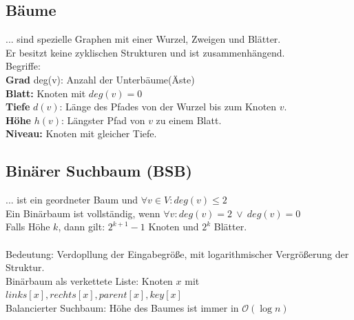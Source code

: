 \documentclass[fs, footer]{latex4ei}
\begin{document}
\begin{multicols*}{4}
{{\subsection{Bäume}
... sind spezielle Graphen mit einer Wurzel, Zweigen und Blätter.\\
Er besitzt keine zyklischen Strukturen und ist zusammenhängend.\\

Begriffe:\\
\textbf{Grad} deg(v): Anzahl der Unterbäume(Äste)\\
\textbf{Blatt:} Knoten mit $deg(v) = 0$\\
\textbf{Tiefe} $d(v)$: Länge des Pfades von der Wurzel bis zum Knoten $v$.\\ 
\textbf{Höhe} $h(v)$: Längster Pfad von $v$ zu einem Blatt.\\   
\textbf{Niveau:} Knoten mit gleicher Tiefe.\\

\subsection{Binärer Suchbaum (BSB)}
... ist ein geordneter Baum und $\forall v \in V:deg(v) \le 2$\\
Ein Binärbaum ist vollständig, wenn $\forall v: deg(v) = 2 \ \lor \ deg(v)=0$\\ 
Falls Höhe $k$, dann gilt: $2^{k+1} - 1$ Knoten und $2^k$ Blätter.\\ 
\\
Bedeutung: Verdopllung der Eingabegröße, mit logarithmischer Vergrößerung der Struktur.\\
Binärbaum als verkettete Liste: Knoten $x$ mit $links[x],rechts[x], parent[x], key[x]$\\

Balancierter Suchbaum: Höhe des Baumes ist immer in $\mathcal O(\log n)$\\
}}
\end{multicols*}
\end{document}
